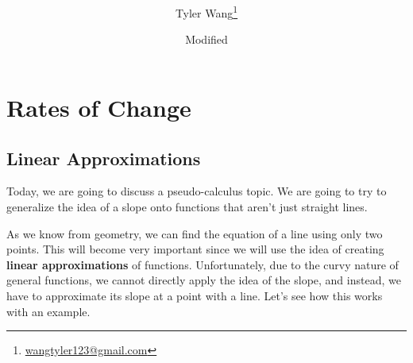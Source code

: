 \documentclass[11pt]{article}
\title{\mytitle \\ [2ex] \Large \mysubtitle}
\date{\small Modified \mydate}
\author {Tyler Wang\thanks{
\href{mailto:wangtyler123@gmail.com}{wangtyler123@gmail.com}}}
\numberwithin{lemma}{section}
\numberwithin{equation}{section}
\numberwithin{define}{section}
\numberwithin{prop}{section}
\numberwithin{figure}{section}
\numberwithin{thm}{section}
\numberwithin{cor}{section}
\newcounter{ex}[section]
\numberwithin{ex}{section}
\begin{document}
\maketitle
\section{Rates of Change}
\subsection{Linear Approximations}
Today, we are going to discuss a pseudo-calculus topic. We are going to try to generalize the idea of a slope onto functions that aren't just straight lines.

As we know from geometry, we can find the equation of a line using only two points. This will become very important since we will use the idea of creating \textbf{linear approximations} of functions. Unfortunately, due to the curvy nature of general functions, we cannot directly apply the idea of the slope, and instead, we have to approximate its slope at a point with a line. Let's see how this works with an example.
\end{document}
